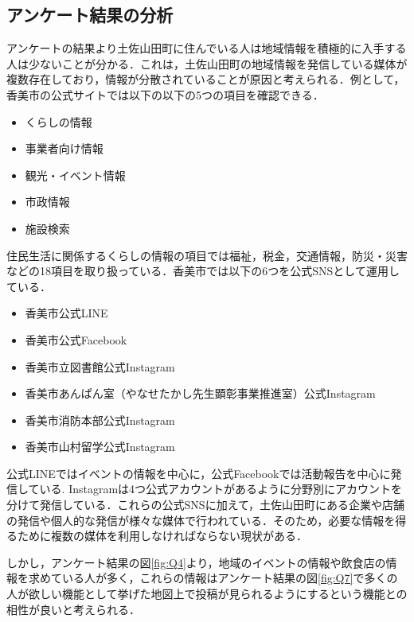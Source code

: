 \subsection{アンケート結果の分析}
アンケートの結果より土佐山田町に住んでいる人は地域情報を積極的に入手する人は少ないことが分かる．これは，土佐山田町の地域情報を発信している媒体が複数存在しており，情報が分散されていることが原因と考えられる．例として，香美市の公式サイト\cite{label1}では以下の以下の5つの項目を確認できる．
\begin{itemize}[itemsep=10pt]
    \item くらしの情報
    \item 事業者向け情報
    \item 観光・イベント情報
    \item 市政情報
    \item 施設検索
\end{itemize}
住民生活に関係するくらしの情報の項目では福祉，税金，交通情報，防災・災害などの18項目を取り扱っている．香美市では以下の6つを公式SNSとして運用している\cite{label2}．
\begin{itemize}[itemsep=10pt]
    \item 香美市公式LINE
    \item 香美市公式Facebook
    \item 香美市立図書館公式Instagram
    \item 香美市あんぱん室（やなせたかし先生顕彰事業推進室）公式Instagram
    \item 香美市消防本部公式Instagram
    \item 香美市山村留学公式Instagram
\end{itemize}
公式LINEではイベントの情報を中心に，公式Facebookでは活動報告を中心に発信している.
Instagramは4つ公式アカウントがあるように分野別にアカウントを分けて発信している．これらの公式SNSに加えて，土佐山田町にある企業や店舗の発信や個人的な発信が様々な媒体で行われている．そのため，必要な情報を得るために複数の媒体を利用しなければならない現状がある．

しかし，アンケート結果の図\ref{fig:Q4}より，地域のイベントの情報や飲食店の情報を求めている人が多く，これらの情報はアンケート結果の図\ref{fig:Q7}で多くの人が欲しい機能として挙げた地図上で投稿が見られるようにするという機能との相性が良いと考えられる．